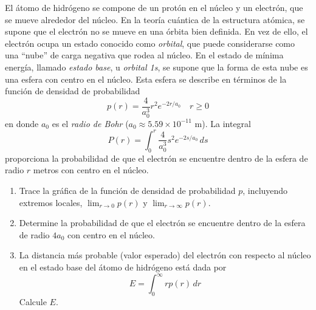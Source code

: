 \item El átomo de hidrógeno se compone de un protón en el núcleo y un electrón, que se mueve alrededor del núcleo. En la teoría cuántica de la estructura atómica, se supone que el electrón no se mueve en una órbita bien definida. En vez de ello, el electrón ocupa un estado conocido como \textit{orbital}, que puede considerarse como una ``nube'' de carga negativa que rodea al núcleo. En el estado de mínima energía, llamado \textit{estado base}, u \textit{orbital 1s}, se supone que la forma de esta nube es una esfera con centro en el núcleo. Esta esfera se describe en términos de la función de densidad de probabilidad
    \[ p(r) = \frac{4}{a_0^3} r^2 e^{-2r/a_0} \quad r \ge 0 \]
    en donde $a_0$ es el \textit{radio de Bohr} ($a_0 \approx 5.59 \times 10^{-11}$ m). La integral
    \[ P(r) = \int_{0}^{r} \frac{4}{a_0^3} s^2 e^{-2s/a_0} \, ds \]
    proporciona la probabilidad de que el electrón se encuentre dentro de la esfera de radio $r$ metros con centro en el núcleo.
    \begin{enumerate}
        \item[(a)] Trace la gráfica de la función de densidad de probabilidad $p$, incluyendo extremos locales, $\lim_{r \to 0} p(r)$ y $\lim_{r \to \infty} p(r)$.
        \item[(b)] Determine la probabilidad de que el electrón se encuentre dentro de la esfera de radio $4a_0$ con centro en el núcleo.
        \item[(c)] La distancia más probable (valor esperado) del electrón con respecto al núcleo en el estado base del átomo de hidrógeno está dada por
        \[ E = \int_{0}^{\infty} r p(r) \, dr \]
        Calcule $E$.
    \end{enumerate}
